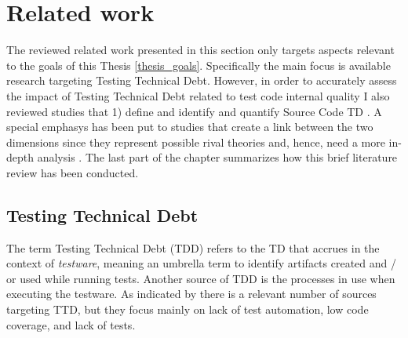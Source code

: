 \chapter{Related work} \label{related_work}

The reviewed related work presented in this section only targets aspects relevant to the goals of this Thesis \ref{thesis_goals}. Specifically the main focus is available research targeting Testing Technical Debt. However, in order to accurately assess the impact of Testing Technical Debt related to test code internal quality I also reviewed studies that 1) define and identify and quantify Source Code TD \cite{mapping_study_td}. A special emphasys has been put to studies that create a link between the two dimensions since they represent possible rival theories and, hence, need a more in-depth analysis \cite{case_study_guide}. The last part of the chapter summarizes how this brief literature review has been conducted.

\section{Testing Technical Debt} \label{testing_td}

The term Testing Technical Debt (TDD) refers to the TD that accrues in the context of \textit{testware}, meaning an umbrella term to identify artifacts created and / or used while running tests. Another source of TDD is the processes in use when executing the testware. As indicated by \cite{mapping_study_td, exploration_of_td, exploration_of_td2} there is a relevant number of sources targeting TTD, but they focus mainly on lack of test automation, low code coverage, and lack of tests.

